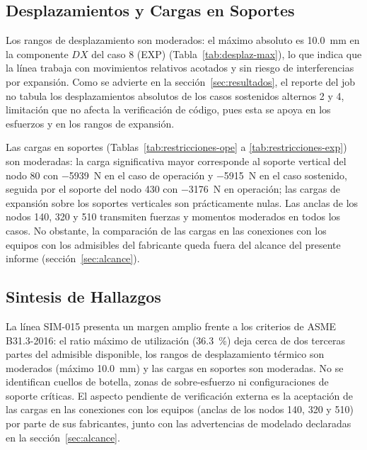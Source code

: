 \subsection{Desplazamientos y Cargas en Soportes}

Los rangos de desplazamiento son moderados: el m\'{a}ximo absoluto es
10.0~\si{mm} en la componente $DX$ del caso 8 (EXP)
(Tabla~\ref{tab:desplaz-max}), lo que indica que la l\'{i}nea trabaja con
movimientos relativos acotados y sin riesgo de interferencias por expansi\'{o}n.
Como se advierte en la secci\'{o}n~\ref{sec:resultados}, el reporte del job no
tabula los desplazamientos absolutos de los casos sostenidos alternos 2 y 4,
limitaci\'{o}n que no afecta la verificaci\'{o}n de c\'{o}digo, pues esta se
apoya en los esfuerzos y en los rangos de expansi\'{o}n.

Las cargas en soportes (Tablas~\ref{tab:restricciones-ope} a
\ref{tab:restricciones-exp}) son moderadas: la carga significativa mayor
corresponde al soporte vertical del nodo 80 con \num{-5939}~\si{N} en el caso
de operaci\'{o}n y \num{-5915}~\si{N} en el caso sostenido, seguida por el
soporte del nodo 430 con \num{-3176}~\si{N} en operaci\'{o}n; las cargas de
expansi\'{o}n sobre los soportes verticales son pr\'{a}cticamente nulas. Las
anclas de los nodos 140, 320 y 510 transmiten fuerzas y momentos moderados en
todos los casos. No obstante, la comparaci\'{o}n de las cargas en las
conexiones con los equipos con los admisibles del fabricante queda fuera del
alcance del presente informe (secci\'{o}n~\ref{sec:alcance}).

\subsection{Sintesis de Hallazgos}

La l\'{i}nea SIM-015 presenta un margen amplio frente a los criterios de
ASME B31.3-2016: el ratio m\'{a}ximo de utilizaci\'{o}n (36.3~\%) deja cerca
de dos terceras partes del admisible disponible, los rangos de desplazamiento
t\'{e}rmico son moderados (m\'{a}ximo 10.0~\si{mm}) y las cargas en soportes
son moderadas. No se identifican cuellos de botella, zonas de sobre-esfuerzo
ni configuraciones de soporte cr\'{i}ticas. El aspecto pendiente de
verificaci\'{o}n externa es la aceptaci\'{o}n de las cargas en las conexiones
con los equipos (anclas de los nodos 140, 320 y 510) por parte de sus
fabricantes, junto con las advertencias de modelado declaradas en la
secci\'{o}n~\ref{sec:alcance}.
